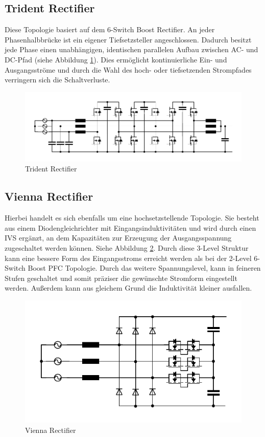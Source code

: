 		\subsection{Trident Rectifier}
		Diese Topologie basiert auf dem 6-Switch Boost Rectifier. An jeder Phasenhalbbrücke ist ein eigener Tiefsetzsteller angeschlossen. Dadurch besitzt jede Phase einen unabhängigen, identischen parallelen Aufbau zwischen AC- und DC-Pfad (siehe Abbildung \ref{fig:trident}). Dies ermöglicht kontinuierliche Ein- und Ausgangsströme und durch die Wahl des hoch- oder tiefsetzenden Strompfades verringern sich die Schaltverluste.
		\begin{figure}
			\centering
			\includegraphics[width=1\linewidth]{content/Grafiken/Trident}
			\caption{Trident Rectifier}
			\label{fig:trident}
		\end{figure}
		
		\subsection{Vienna Rectifier}
		Hierbei handelt es sich ebenfalls um eine hochsetzstellende Topologie. Sie besteht aus einem Diodengleichrichter mit Eingangsinduktivitäten und wird durch einen \gls{IVS} ergänzt, an dem Kapazitäten zur Erzeugung der Ausgangsspannung zugeschaltet werden können. Siehe Abbildung \ref{fig:vienna}. Durch diese 3-Level Struktur kann eine bessere Form des Eingangsstroms erreicht werden als bei der 2-Level 6-Switch Boost PFC Topologie. Durch das weitere Spannungslevel, kann in feineren Stufen geschaltet und somit präziser die gewünschte Stromform eingestellt werden. Außerdem kann aus gleichem Grund die Induktivität kleiner ausfallen.
		\begin{figure}
			\centering
			\includegraphics[width=0.7\linewidth]{content/Grafiken/Vienna}
			\caption{Vienna Rectifier}
			\label{fig:vienna}
		\end{figure}
	

